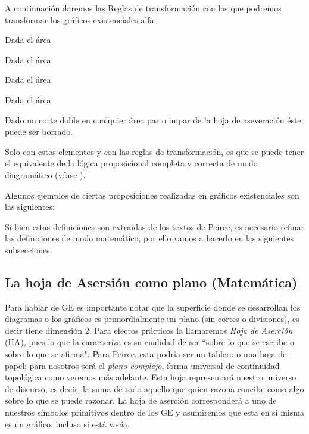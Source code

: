 \documentclass[
	fontsize=10pt, %
	twoside=true, %
	secnumdepth=1, %
	abstract=true, %
]{kaohandt}
\begin{document}
A continuación daremos las Reglas de transformación con las que podremos transformar los gráficos existenciales alfa:

\begin{definition}
	Dada el área
\end{definition}

\begin{definition}
	Dada el área
\end{definition}

\begin{definition}
	Dada el área
\end{definition}

\begin{definition}
	Dada el área
\end{definition}

\begin{definition}
	Dado un corte doble en cualquier área par o impar de la hoja de aseveración éste puede ser borrado.
\end{definition}

Solo con estos elementos y con las reglas de transformación, es que se puede tener el equivalente de la lógica proposicional completa y correcta de modo diagramático (véase ).

Algunos ejemplos de ciertas proposiciones realizadas en gráficos existenciales son las siguientes:



Si bien estas definiciones son extraidas de los textos de Peirce, es necesario refinar las definiciones de modo matemático, por ello vamos a hacerlo en las siguientes subsecciones.
\subsection{La hoja de Asersión como plano (Matemática)}

Para hablar de GE es importante notar que la superficie donde se desarrollan los diagramas o los gráficos es primordialmente un plano (sin cortes o divisiones), es decir tiene dimensión 2. Para efectos prácticos la llamaremos \textit{Hoja de Aserción} (HA), pues lo que la caracteriza es su cualidad de ser ``sobre lo que se escribe o sobre lo que se afirma". Para Peirce, esta podría ser un tablero o una hoja de papel; para nosotros será el \emph{plano complejo}, forma universal de continuidad topológica como veremos más adelante. Esta hoja representará nuestro universo de discurso, es decir, la suma de todo aquello que quien razona concibe como algo sobre lo que se puede razonar. La hoja de aserción corresponderá a uno de nuestros símbolos primitivos dentro de los GE y asumiremos que esta en sí misma es un gráfico, incluso si está vacía. 
\end{document}
